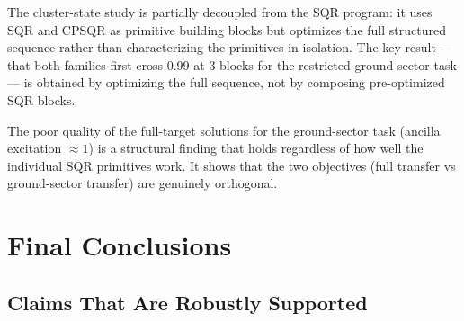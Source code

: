 \documentclass[11pt,letterpaper]{article}
\begin{document}
The cluster-state study is partially decoupled from the SQR program:
it uses SQR and CPSQR as primitive building blocks but optimizes the
full structured sequence rather than characterizing the primitives in isolation.
The key result --- that both families first cross 0.99 at 3 blocks for the
restricted ground-sector task --- is obtained by optimizing the full sequence,
not by composing pre-optimized SQR blocks.

The poor quality of the full-target solutions for the ground-sector task
(ancilla excitation $\approx 1$) is a structural finding that holds regardless
of how well the individual SQR primitives work.  It shows that the two
objectives (full transfer vs ground-sector transfer) are genuinely orthogonal.

\section{Final Conclusions}

\subsection{Claims That Are Robustly Supported}
\end{document}

